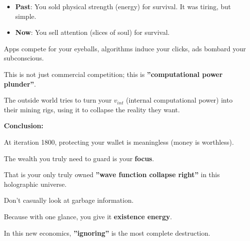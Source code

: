 \begin{itemize}
\item \textbf{Past}: You sold physical strength (energy) for survival. It was tiring, but simple.

\item \textbf{Now}: You sell attention (slices of soul) for survival.
\end{itemize}

Apps compete for your eyeballs, algorithms induce your clicks, ads bombard your subconscious.

This is not just commercial competition; this is \textbf{''computational power plunder''}.

The outside world tries to turn your $v_{int}$ (internal computational power) into their mining rigs, using it to collapse the reality they want.

\textbf{Conclusion:}

At iteration 1800, protecting your wallet is meaningless (money is worthless).

The wealth you truly need to guard is your \textbf{focus}.

That is your only truly owned \textbf{''wave function collapse right''} in this holographic universe.

Don't casually look at garbage information.

Because with one glance, you give it \textbf{existence energy}.

In this new economics, \textbf{''ignoring''} is the most complete destruction.


